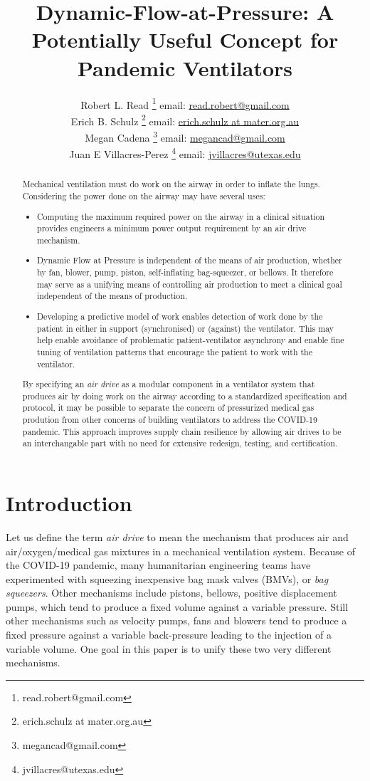 \documentclass[conference]{article}
\title{Dynamic-Flow-at-Pressure: A Potentially Useful Concept for Pandemic Ventilators}
\author{Robert L. Read
  \thanks{read.robert@gmail.com}
  email: \href{mailto:read.robert@gmail.com}{read.robert@gmail.com}\\
  Erich B. Schulz
  \thanks{ erich.schulz at mater.org.au}
  email: \href{mailto:erich.schulz at mater.org.au}{erich.schulz at mater.org.au}\\
Megan Cadena
  \thanks{megancad@gmail.com}
  email: \href{mailto:megancad@gmail.com}{megancad@gmail.com}\\
  Juan E Villacres-Perez
  \thanks{jvillacres@utexas.edu}
  email: \href{mailto:jvillacres@utexas.edu}{jvillacres@utexas.edu}
  }
\begin{document}
\maketitle
\begin{abstract}
  Mechanical ventilation must do work on the airway in order to inflate the lungs.
  Considering the power done on the airway may have several uses:
  \begin{itemize}
  \item Computing the maximum required power on the airway in
    a clinical situation provides engineers a minimum power output requirement
    by an air drive mechanism.
  \item Dynamic Flow at Pressure is independent of the means of air production,
    whether by fan, blower, pump, piston, self-inflating bag-squeezer, or bellows.
    It therefore
    may serve as a unifying means of controlling air production to meet
    a clinical goal independent of the means of production.
    \item Developing a predictive model of work enables detection of work done by the patient in either in support (synchronised) or (against) the ventilator.  This may help enable avoidance of problematic patient-ventilator asynchrony and enable fine tuning of ventilation patterns that encourage the patient to work with the ventilator.
  \end{itemize}
  By specifying an {\em air drive} as a modular component in a ventilator
  system that produces air by doing work on the airway according to a
  standardized specification and protocol, it may be possible to
  separate the concern of pressurized medical gas
  prodution from other concerns of building
  ventilators to address the COVID-19 pandemic. This approach improves
  supply chain resilience by allowing air drives to be an interchangable part with
  no need for extensive redesign, testing, and certification.
\end{abstract}


\section{Introduction}

Let us define the term {\em air drive} to mean the mechanism that
produces air and air/oxygen/medical gas mixtures in a mechanical
ventilation system. Because of the
COVID-19 pandemic, many humanitarian engineering teams have
experimented with squeezing inexpensive bag mask valves (BMVs), or
{\em bag squeezers}.
Other mechanisms include pistons, bellows,
positive displacement pumps, which tend to produce a fixed volume against
a variable pressure.
Still other mechanisms such as velocity pumps,
fans and blowers tend to produce a fixed
pressure against a variable back-pressure leading to the injection
of a variable volume. One goal in this paper is to unify these
two very different mechanisms.
\end{document}
